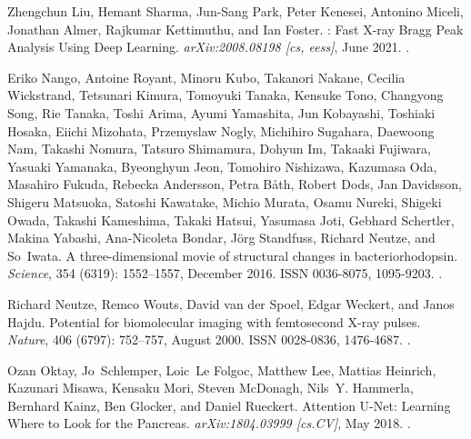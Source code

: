 \documentclass[a4paper]{article}
\begin{document}
\begin{thebibliography}{33}
Zhengchun Liu, Hemant Sharma, Jun-Sang Park, Peter Kenesei, Antonino Miceli,
  Jonathan Almer, Rajkumar Kettimuthu, and Ian Foster.
: {{Fast X-ray Bragg Peak Analysis Using Deep Learning}}.
\newblock \emph{arXiv:2008.08198 [cs, eess]}, June 2021.
\newblock {}.

Eriko Nango, Antoine Royant, Minoru Kubo, Takanori Nakane, Cecilia Wickstrand,
  Tetsunari Kimura, Tomoyuki Tanaka, Kensuke Tono, Changyong Song, Rie Tanaka,
  Toshi Arima, Ayumi Yamashita, Jun Kobayashi, Toshiaki Hosaka, Eiichi
  Mizohata, Przemyslaw Nogly, Michihiro Sugahara, Daewoong Nam, Takashi Nomura,
  Tatsuro Shimamura, Dohyun Im, Takaaki Fujiwara, Yasuaki Yamanaka, Byeonghyun
  Jeon, Tomohiro Nishizawa, Kazumasa Oda, Masahiro Fukuda, Rebecka Andersson,
  Petra B{\aa}th, Robert Dods, Jan Davidsson, Shigeru Matsuoka, Satoshi
  Kawatake, Michio Murata, Osamu Nureki, Shigeki Owada, Takashi Kameshima,
  Takaki Hatsui, Yasumasa Joti, Gebhard Schertler, Makina Yabashi, Ana-Nicoleta
  Bondar, J{\"o}rg Standfuss, Richard Neutze, and So~Iwata.
\newblock A three-dimensional movie of structural changes in bacteriorhodopsin.
\newblock \emph{Science}, 354 (6319): 1552--1557, December
  2016.
\newblock ISSN 0036-8075, 1095-9203.
\newblock {}.

Richard Neutze, Remco Wouts, David {van der Spoel}, Edgar Weckert, and Janos
  Hajdu.
\newblock Potential for biomolecular imaging with femtosecond {{X-ray}} pulses.
\newblock \emph{Nature}, 406 (6797): 752--757, August 2000.
\newblock ISSN 0028-0836, 1476-4687.
\newblock {}.

Ozan Oktay, Jo~Schlemper, Loic~Le Folgoc, Matthew Lee, Mattias Heinrich,
  Kazunari Misawa, Kensaku Mori, Steven McDonagh, Nils~Y. Hammerla, Bernhard
  Kainz, Ben Glocker, and Daniel Rueckert.
\newblock Attention {{U-Net}}: {{Learning Where}} to {{Look}} for the
  {{Pancreas}}.
\newblock \emph{arXiv:1804.03999 [cs.CV]}, May 2018.
\newblock {}.


\end{thebibliography}
\end{document}
